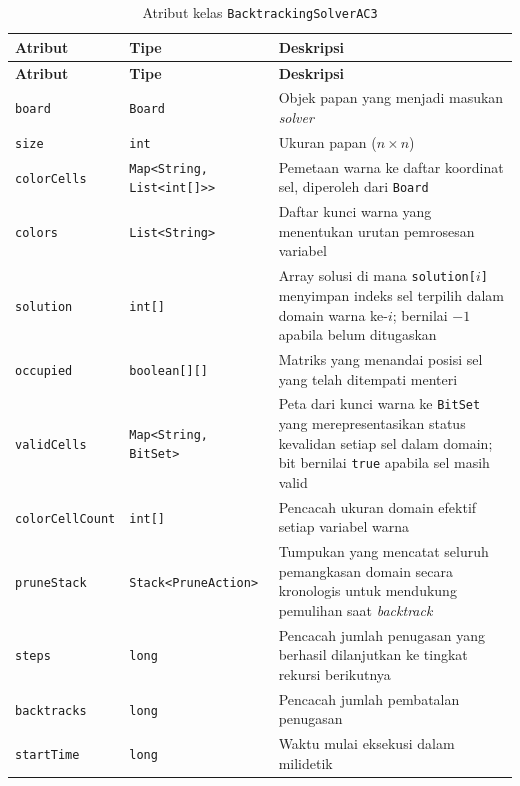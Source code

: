 \begin{longtable}{llp{5.5cm}}
	\caption{Atribut kelas \texttt{BacktrackingSolverAC3}}
	\label{tab:attr-backtracking} \\
	\toprule
	\textbf{Atribut} & \textbf{Tipe} & \textbf{Deskripsi} \\
	\midrule
	\endfirsthead
	\toprule
	\textbf{Atribut} & \textbf{Tipe} & \textbf{Deskripsi} \\
	\midrule
	\endhead
	\bottomrule
	\endfoot
	\texttt{board} & \texttt{Board} & Objek papan yang menjadi masukan \textit{solver} \\
	\midrule
	\texttt{size} & \texttt{int} & Ukuran papan ($n \times n$) \\
	\midrule
	\texttt{colorCells} & \texttt{Map<String, List<int[]>{}>} & Pemetaan warna ke daftar koordinat sel, diperoleh dari \texttt{Board} \\
	\midrule
	\texttt{colors} & \texttt{List<String>} & Daftar kunci warna yang menentukan urutan pemrosesan variabel \\
	\midrule
	\texttt{solution} & \texttt{int[]} & Array solusi di mana \texttt{solution[$i$]} menyimpan indeks sel terpilih dalam domain warna ke-$i$; bernilai $-1$ apabila belum ditugaskan \\
	\midrule
	\texttt{occupied} & \texttt{boolean[][]} & Matriks yang menandai posisi sel yang telah ditempati menteri \\
	\midrule
	\texttt{validCells} & \texttt{Map<String, BitSet>} & Peta dari kunci warna ke \texttt{BitSet} yang merepresentasikan status kevalidan setiap sel dalam domain; bit bernilai \texttt{true} apabila sel masih valid \\
	\midrule
	\texttt{colorCellCount} & \texttt{int[]} & Pencacah ukuran domain efektif setiap variabel warna \\
	\midrule
	\texttt{pruneStack} & \texttt{Stack<PruneAction>} & Tumpukan yang mencatat seluruh pemangkasan domain secara kronologis untuk mendukung pemulihan saat \textit{backtrack} \\
	\midrule
	\texttt{steps} & \texttt{long} & Pencacah jumlah penugasan yang berhasil dilanjutkan ke tingkat rekursi berikutnya \\
	\midrule
	\texttt{backtracks} & \texttt{long} & Pencacah jumlah pembatalan penugasan \\
	\midrule
	\texttt{startTime} & \texttt{long} & Waktu mulai eksekusi dalam milidetik \\
	\bottomrule
\end{longtable}

